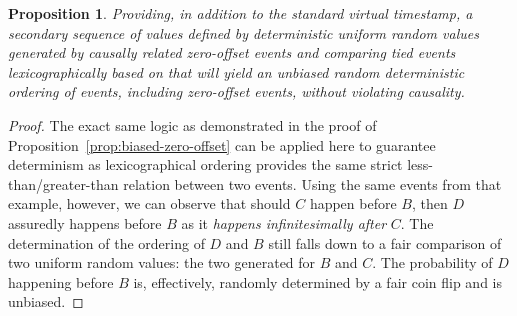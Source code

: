 \documentclass[nonacm,sigconf]{acmart}
\newtheorem{conjecture}{Conjecture}
\newtheorem{proposition}{Proposition}
\begin{document}
\begin{proposition}\label{prop:unbiased-zero-offset}
  Providing, in addition to the standard virtual timestamp, a secondary sequence of values defined by deterministic uniform random values generated by causally related zero-offset events and comparing tied events lexicographically based on that will yield an unbiased random deterministic ordering of events, including zero-offset events, without violating causality.
\end{proposition}
\begin{proof}
  The exact same logic as demonstrated in the proof of Proposition~\ref{prop:biased-zero-offset} can be applied here to guarantee determinism as lexicographical ordering provides the same strict less-than/greater-than relation between two events. Using the same events from that example, however, we can observe that should $C$ happen before $B$, then $D$ assuredly happens before $B$ as it \emph{happens infinitesimally after} $C$. The determination of the ordering of $D$ and $B$ still falls down to a fair comparison of two uniform random values: the two generated for $B$ and $C$. The probability of $D$ happening before $B$ is, effectively, randomly determined by a fair coin flip and is unbiased.
\end{proof}



\end{document}
